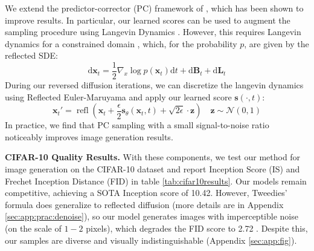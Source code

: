 \documentclass{article}
\theoremstyle{plain}
\theoremstyle{definition}
\theoremstyle{remark}
\DeclareMathOperator{\refl}{refl}
\newcommand{\grad}{\nabla}
\renewcommand{\vec}{\mathbf}
\newcommand{\dd}{\mathrm{d}}
\begin{document}
We extend the predictor-corrector (PC) framework of \citet{Song2020ScoreBasedGM}, which has been shown to improve results. In particular, our learned scores can be used to augment the sampling procedure using Langevin Dynamics \citep{Song2019GenerativeMB}. However, this requires Langevin dynamics for a constrained domain \citep{Bubeck2015FiniteTimeAO}, which, for the probability $p$, are given by the reflected SDE:
\begin{equation}
    \dd\vec{x}_t = \frac{1}{2} \grad_x \log p(\vec{x}_t) \dd t + \dd \vec{B}_t + \dd \vec{L}_t
\end{equation}
During our reversed diffusion iterations, we can discretize the langevin dynamics using Reflected Euler-Maruyama and apply our learned score $\vec{s}(\cdot, t)$:
\begin{equation}
    \vec{x}_t' = \refl(\vec{x}_t + \frac{\epsilon}{2} \vec{s}_\theta(\vec{x}_t, t) + \sqrt{2\epsilon} \cdot \vec{z}) \quad \vec{z} \sim \mathcal{N}(0, 1)
\end{equation}
In practice, we find that PC sampling with a small signal-to-noise ratio noticeably improves image generation results.

\textbf{CIFAR-10 Quality Results.} With these components, we test our method for image generation on the CIFAR-10 dataset and report Inception Score (IS) \citep{Salimans2016ImprovedTF} and Frechet Inception Distance (FID) \citep{Heusel2017GANsTB} in table \ref{tab:cifar10results}. Our models remain competitive, achieving a SOTA Inception score of 10.42. However, Tweedies' formula does generalize to reflected diffusion \citep{Efron2011TweediesFA} (more details are in Appendix \ref{sec:app:prac:denoise}), so our model generates images with imperceptible noise (on the scale of $1-2$ pixels), which degrades the FID score to 2.72 \citep{JolicoeurMartineau2020AdversarialSM}. Despite this, our samples are diverse and visually indistinguishable (Appendix \ref{sec:app:fig}).
\end{document}
